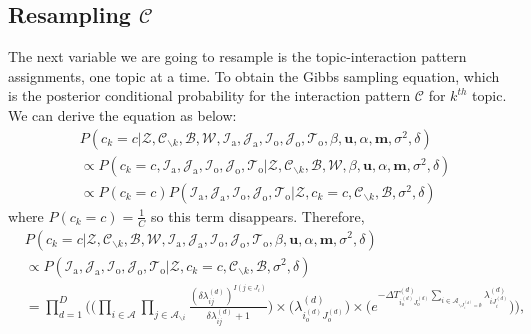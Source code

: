 \documentclass[a4paper]{article}
\begin{document}
 \subsection{Resampling $\mathcal{C}$} \label{subsec: Resampling C}
 The next variable we are going to resample is the topic-interaction pattern assignments, one topic at a time. To obtain the Gibbs sampling equation, which is the posterior conditional probability for the interaction pattern $\mathcal{C}$ for $k^{th}$ topic. We can derive the equation as below:
 \begin{equation}
 \begin{aligned} & P(c_k=c|\mathcal{Z},   \mathcal{C}_{\backslash k},   \mathcal{B},\mathcal{W}, \mathcal{I}_{\mbox{a}}, \mathcal{J}_{\mbox{a}}, \mathcal{I}_{\mbox{o}}, \mathcal{J}_{\mbox{o}}, \mathcal{T}_{\mbox{o}}, \beta, \boldsymbol{u}, \alpha, \boldsymbol{m}, \sigma^2,  \delta)\\
 &\propto P(c_k=c, \mathcal{I}_{\mbox{a}}, \mathcal{J}_{\mbox{a}}, \mathcal{I}_{\mbox{o}}, \mathcal{J}_{\mbox{o}}, \mathcal{T}_{\mbox{o}}|\mathcal{Z}, \mathcal{C}_{\backslash k},   \mathcal{B},\mathcal{W}, \beta, \boldsymbol{u}, \alpha, \boldsymbol{m}, \sigma^2, \delta)\\
& \propto P(c_k=c)P(\mathcal{I}_{\mbox{a}}, \mathcal{J}_{\mbox{a}}, \mathcal{I}_{\mbox{o}}, \mathcal{J}_{\mbox{o}}, \mathcal{T}_{\mbox{o}}| \mathcal{Z}, c_k=c, \mathcal{C}_{\backslash k}, \mathcal{B}, \sigma^2, \delta)
 \end{aligned}
 \end{equation}
 where $P(c_k=c) = \frac{1}{C}$ so this term disappears. Therefore, 
 \begin{equation}
 \begin{aligned}
 &P(c_k=c|\mathcal{Z},   \mathcal{C}_{\backslash k},   \mathcal{B},\mathcal{W}, \mathcal{I}_{\mbox{a}}, \mathcal{J}_{\mbox{a}}, \mathcal{I}_{\mbox{o}}, \mathcal{J}_{\mbox{o}}, \mathcal{T}_{\mbox{o}}, \beta, \boldsymbol{u}, \alpha, \boldsymbol{m}, \sigma^2, \delta)\\&\propto P(\mathcal{I}_{\mbox{a}}, \mathcal{J}_{\mbox{a}}, \mathcal{I}_{\mbox{o}}, \mathcal{J}_{\mbox{o}}, \mathcal{T}_{\mbox{o}}| \mathcal{Z}, c_k=c, \mathcal{C}_{\backslash k}, \mathcal{B}, \sigma^2,  \delta)\\&=\prod_{d=1}^D\Bigg(\Big(\prod_{i\in \mathcal{A}}\prod_{j \in \mathcal{A}_{\backslash i }} \frac{(\delta\lambda^{(d)}_{ij})^{I(j \in J_i)}}{\delta\lambda^{(d)}_{ij}+1}\Big)\times \Big(\lambda^{(d)}_{i_o^{(d)}J_{o}^{(d)}}\Big)\times  \Big(e^{-\Delta T^{(d)}_{i_o^{(d)}J_o^{(d)}}\sum\limits_{i\in \mathcal{A}_{\backslash J^{(d)}_i = \emptyset}}\lambda^{(d)}_{iJ^{(d)}_{i}}}\Big)\Bigg),
 \end{aligned}
 \end{equation} 
\end{document}
